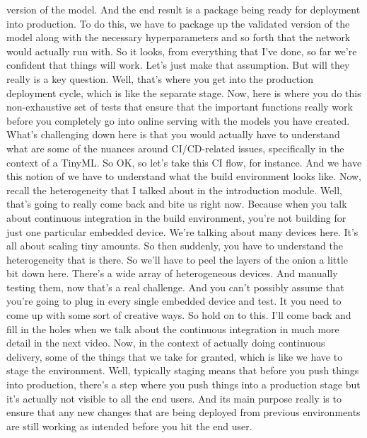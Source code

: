{{{    version of the model.
    And the end result is a package being ready for deployment into production.
    To do this, we have to package up the validated version of the model
    along with the necessary hyperparameters and so forth
    that the network would actually run with.
    So it looks, from everything that I've done,
    so far we're confident that things will work.
    Let's just make that assumption.
    But will they really is a key question.
    Well, that's where you get into the production deployment cycle, which
    is like the separate stage.
    Now, here is where you do this non-exhaustive set of tests
    that ensure that the important functions really
    work before you completely go into online serving
    with the models you have created.
    What's challenging down here is that you would actually have to understand what
    are some of the nuances around CI/CD-related issues,
    specifically in the context of a TinyML.
    So OK, so let's take this CI flow, for instance.
    And we have this notion of we have to understand
    what the build environment looks like.
    Now, recall the heterogeneity that I talked about
    in the introduction module.
    Well, that's going to really come back and bite us right now.
    Because when you talk about continuous integration in the build environment,
    you're not building for just one particular embedded device.
    We're talking about many devices here.
    It's all about scaling tiny amounts.
    So then suddenly, you have to understand the heterogeneity that is there.
    So we'll have to peel the layers of the onion a little bit down here.
    There's a wide array of heterogeneous devices.
    And manually testing them, now that's a real challenge.
    And you can't possibly assume that you're
    going to plug in every single embedded device and test.
    It you need to come up with some sort of creative ways.
    So hold on to this.
    I'll come back and fill in the holes when
    we talk about the continuous integration in much more detail in the next video.
    Now, in the context of actually doing continuous delivery,
    some of the things that we take for granted, which is like we
    have to stage the environment.
    Well, typically staging means that before you push things into production,
    there's a step where you push things into a production stage
    but it's actually not visible to all the end users.
    And its main purpose really is to ensure that any new changes that
    are being deployed from previous environments
    are still working as intended before you hit the end user.
}}}
